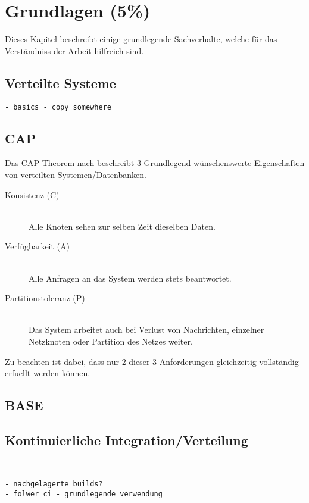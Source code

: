 \chapter{Grundlagen (5\%)}
\label{chap:base}
Dieses Kapitel beschreibt einige grundlegende Sachverhalte,
welche f\"ur das Verst\"andniss der Arbeit hilfreich sind.

\section{Verteilte Systeme}
\label{sec:base:vs}

\begin{verbatim}
- basics - copy somewhere
\end{verbatim}

\section{CAP}
\label{sec:base:cap}


Das CAP Theorem nach \cite{brewer:cap} beschreibt 3 Grundlegend
w\"unschenswerte Eigenschaften von verteilten Systemen/Datenbanken.

\begin{description}
  \item[Konsistenz (C)] \hfill \\
      Alle Knoten sehen zur selben Zeit dieselben Daten. 
  \item[Verf\"ugbarkeit (A)] \hfill \\
      Alle Anfragen an das System werden stets beantwortet.
  \item[Partitionstoleranz (P)] \hfill \\
      Das System arbeitet auch bei Verlust von Nachrichten,
      einzelner Netzknoten oder Partition des Netzes weiter.
\end{description}

Zu beachten ist dabei, dass nur 2 dieser 3 Anforderungen gleichzeitig
vollst\"andig erfuellt werden k\"onnen.






\section{BASE}
\label{sec:base:base}

\section{Kontinuierliche Integration/Verteilung}
\label{sec:base:ci}
\begin{verbatim}


- nachgelagerte builds?
- folwer ci - grundlegende verwendung 
\end{verbatim}
\cite{folwer:receipe}

